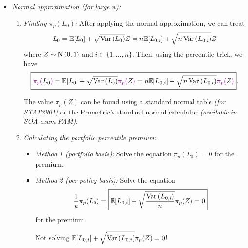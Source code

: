 \begin{enumerate}
\begin{itemize}
\textbf{Shortcut:}
\begin{enumerate}[label={(\arabic*)}]
\item \emph{Finding \(\pi_p(L_0)\):}
\[
\pi_{p}(L_0)=
\begin{cases}
g(\pi_{\rc{1-p}}(T_x))&\text{when \(L_0=g(T_x)\)}, \\
h(\pi_{\rc{p}}(T_x))&\text{when \(L_0=h(T_x)\)}.
\end{cases}
\]
\item \emph{Calculating the portfolio percentile premium:} Solve the equation
\(\pi_{p}(L_0)=0\) for the premium.
\end{enumerate}
\item \emph{Normal approximation (for large \(n\)):}
\begin{enumerate}[label={(\arabic*)}]
\item \emph{Finding \(\pi_{p}(L_0)\):} After applying the normal approximation,
we can treat
\[
L_0=\mathbb{E}\qty[L_0]+\sqrt{\operatorname{Var}\qty(L_0)}Z
=n\mathbb{E}\qty[L_{0,i}]+\sqrt{n\operatorname{Var}\qty(L_{0,i})}Z
\]
where \(Z\sim\operatorname{N}\qty(0,1)\) and \(i\in\{1,\dotsc,n\}\). Then, using the
percentile trick, we have
\[
\boxed{{\color{violet}\pi_{p}(}L_0{\color{violet})}=\mathbb{E}\qty[L_0]+\sqrt{\operatorname{Var}\qty(L_0)}{\color{violet}\pi_{p}(}Z{\color{violet})}
=n\mathbb{E}\qty[L_{0,i}]+\sqrt{n\operatorname{Var}\qty(L_{0,i})}{\color{violet}\pi_{p}(}Z{\color{violet})}}.
\]
\begin{note}
The value \(\pi_{p}(Z)\) can be found using a standard normal table \emph{(for
STAT3901)} or the \href{https://www.prometric.com/soa}{Prometric's standard
normal calculator} \emph{(available in SOA exam FAM)}.
\end{note}
\item \emph{Calculating the portfolio percentile premium:}
\begin{itemize}
\item \emph{Method 1 (portfolio basis):} Solve the equation \(\pi_{p}(L_0)=0\) for the premium.
\item \emph{Method 2 (per-policy basis):} Solve the equation
\[\frac{1}{n}\pi_p(L_0)=\boxed{\mathbb{E}\qty[L_{0,i}]+\sqrt{\frac{\operatorname{Var}\qty(L_{0,i})}{n}}\pi_{p}(Z)=0}\]
for the premium.
\begin{warning}
Not solving \(\displaystyle \mathbb{E}\qty[L_{0,i}]+\sqrt{\operatorname{Var}\qty(L_{0,i})}\pi_{p}(Z)=0\)!
\end{warning}
\end{itemize}
\end{enumerate}
\end{itemize}


\end{enumerate}
